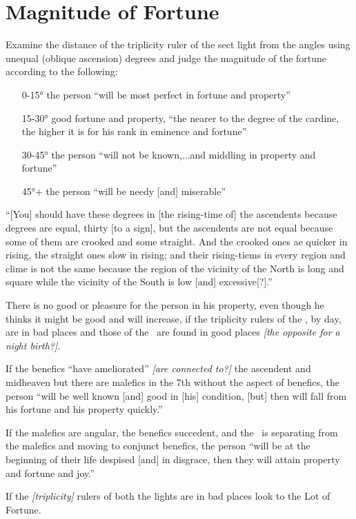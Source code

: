 \section{Magnitude of Fortune}

Examine the distance of the triplicity ruler of the sect light from the angles using unequal (oblique ascension) degrees and judge the magnitude of the fortune according to the following:
\begin{itemize}[topsep=0em,itemsep=0em]
\item[0-15°] the person ``will be most perfect in fortune and property''
\item[15-30°] good fortune and property, ``the nearer to the degree of the cardine, the higher it is for his rank in eminence and fortune''
\item[30-45°] the person ``will not be known,...and middling in property and fortune''
\item[45°+]  the person ``will be needy [and] miserable''
\end{itemize}

``[You] should have these degrees in [the rising-time of] the ascendents because degrees are equal, thirty [to a sign], but the ascendents are not equal because some of them are crooked and some straight. And the crooked ones ae quicker in rising, the straight ones slow in rising; and their rising-tiems in every region and clime is not the same because the region of the vicinity of the North is long and square while the vicinity of the South is low [and] excessive[?].''

There is no good or pleasure for the person in his property, even though he thinks it might be good and will increase, if the triplicity rulers of the \Sun, by day, are in bad places and those of the \Moon\, are found in good places \textsl{[the opposite for a night birth?]}.

If the benefics ``have ameliorated'' \textsl{[are connected to?]} the ascendent and midheaven but there are malefics in the 7th without the aspect of benefics, the person ``will be well known [and] good in [his] condition, [but] then will fall from his fortune and his property quickly.''

If the malefics are angular, the benefics succedent, and the \Moon\, is separating from the malefics and moving to conjunct  benefics, the person ``will be at the beginning of their life despised [and] in disgrace, then they will attain property and fortune and joy.''

If the \textsl{[triplicity]} rulers of both the lights are in bad places look to the Lot of Fortune.

